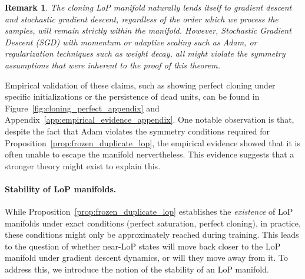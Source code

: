 \documentclass{article}
\newcommand{\GIU}[1]{\todo[color=purple!30,size=\tiny]{GIU: #1}}
\newtheorem{remark}{Remark}[section]
\numberwithin{figure}{section}
\begin{document}

\begin{remark}
The cloning LoP manifold naturally lends itself to gradient descent and stochastic gradient descent, regardless of the order which we process the samples, will remain strictly within the manifold. However, Stochastic Gradient Descent (SGD) with momentum or adaptive scaling such as Adam, or regularization techniques such as weight decay, all might violate the symmetry assumptions that were inherent to the proof of this theorem.
\end{remark}

Empirical validation of these claims, such as showing perfect cloning under specific initializations  or the persistence of dead units, can be found in Figure~\ref{fig:cloning_perfect_appendix} and Appendix~\ref{app:empirical_evidence_appendix}. One notable observation is that, despite the fact that Adam violates the symmetry conditions required for Proposition~\ref{prop:frozen_duplicate_lop}, the empirical evidence showed that it is often unable to escape the manifold nervertheless. This evidence suggests that a stronger theory might exist to explain this.


\paragraph{Stability of LoP manifolds.}
While Proposition~\ref{prop:frozen_duplicate_lop} establishes the \emph{existence} of LoP manifolds under exact conditions (perfect saturation, perfect cloning), in practice, these conditions might only be approximately reached during training. This leads to the question of whether  near-LoP states will move back closer to the LoP manifold under gradient descent dynamics, or will they move away from it. To address this, we introduce the notion of the stability of an LoP manifold.
\end{document}
